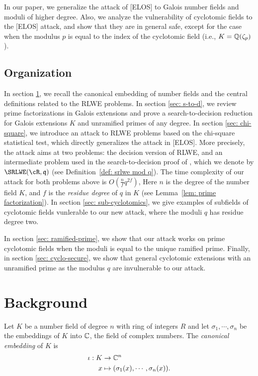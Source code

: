 \documentclass{amsart}
\begin{document}
In our paper, we generalize the attack of [ELOS] to Galois number fields and moduli of higher degree. Also, we analyze the vulnerability of cyclotomic fields to the [ELOS] attack, and show that they are in general safe, except for the case when the modulus $p$ is equal to the index of the cyclotomic field (i.e., $K = \mathbb{Q}(\zeta_p)$).


\subsection{Organization}

In section \ref{sec: background}, we recall the canonical embedding of number fields and the central definitions related to the RLWE problems. In section \ref{sec: s-to-d}, we review prime factorizations in Galois extensions and prove a search-to-decision reduction for Galois extensions $K$ and unramified primes of any degree. In section \ref{sec: chi-square}, we introduce an attack to RLWE problems based on the chi-square statistical test, which directly generalizes the attack in [ELOS]. More precisely, the attack aims at two problems: the decision version of RLWE, and an intermediate problem used in the search-to-decision proof of \cite{lyubashevsky2013ideal}, which we denote by $\SRLWE(\cR,\fq)$ (see Definition~\ref{def: srlwe mod q}). The time complexity of our attack for both problems above is $O(\frac{n}{f}q^{2f})$, Here $n$ is the degree of the number field $K$, and $f$ is the {\it residue degree} of $q$ in $K$ (see Lemma~\ref{lem: prime factorization}). In section \ref{sec: sub-cyclotomics}, we give examples of subfields of cyclotomic fields vunlerable to our new attack, where the moduli $q$ has residue degree two.

In section \ref{sec: ramified-prime}, we show that our attack works on prime cyclotomic fields when the moduli is equal to the unique ramified prime. Finally, in section \ref{sec: cyclo-secure}, we show that general cyclotomic extensions with an unramified prime as the modulus $q$ are invulnerable to our attack.





\section{Background} \label{sec: background}

Let $K$ be a number field of degree $n$ with ring of integers $R$ and let $\sigma_1, \cdots, \sigma_n$ be the embeddings of $K$ into $\mathbb{C}$, the field of complex numbers. The {\it canonical embedding} of $K$ is
\begin{align*}
    \iota: K &\to \mathbb{C}^n \\
     x & \mapsto (\sigma_1(x), \cdots, \sigma_n(x)).
\end{align*}
\end{document}
